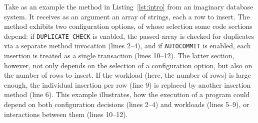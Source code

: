 Take as an example the method in Listing~\ref{lst:intro} from an imaginary database system. It receives as an argument an array of strings, each a row to insert. The method exhibits two configuration options, of whose selection some code sections depend: if \texttt{DUPLICATE\_CHECK} is enabled, the passed array is checked for duplicates via a separate method invocation (lines 2--4), and if \texttt{AUTOCOMMIT} is enabled, each insertion is treated as a single transaction (lines 10--12). The latter section, however, not only depends on the selection of a configuration option, but also on the number of rows to insert. If the workload (here, the number of rows) is large enough, the individual insertion per row (line 9) is replaced by another insertion method (line 6). This example illustrates, how the execution of a program could depend on both configuration decisions (lines 2--4) and workloads (lines 5--9), or interactions between them (lines 10--12).

